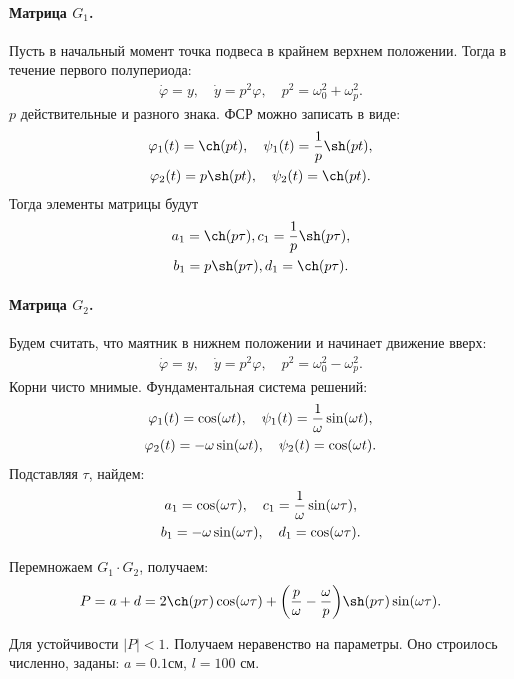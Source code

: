 \paragraph{Матрица $G_1$.} Пусть в начальный момент точка подвеса в крайнем верхнем положении. Тогда в течение первого полупериода:
\begin{gather*}
	\dot{\varphi}=y,\quad
	\dot{y}=p^2\varphi,\quad
	p^2=\omega_0^2 + \omega_p^2.
\end{gather*}
$p$ действительные и разного знака. ФСР можно записать в виде:
\begin{gather}
	\phi_1(t)=\ch(pt),\quad \psi_1(t)=\frac1{p}\sh(pt), \notag \\ 
	\phi_2(t)=p\sh(pt),\quad \psi_2(t)=\ch(pt).		
	\label{eq:90}
\end{gather}
Тогда элементы матрицы будут
\begin{gather*}
	a_1=\ch(p\tau), c_1=\frac1{p}\sh(p\tau), \notag \\ 
	b_1=p\sh(p\tau), d_1=\ch(p\tau).		
\end{gather*}

\paragraph{Матрица $G_2$.} Будем считать, что маятник в нижнем положении и начинает движение вверх:
\begin{gather}
	\dot{\varphi}=y,\quad
	\dot{y}=p^2\varphi,\quad
	p^2=\omega_0^2 - \omega_p^2.
	\label{eq:91}
\end{gather}
Корни чисто мнимые. Фундаментальная система решений:
\begin{gather*}
	\phi_1(t)=\cos(\omega t),\quad \psi_1(t)=\frac1{\omega}\sin(\omega t), \notag \\ 
	\phi_2(t)=-\omega \sin(\omega t),\quad \psi_2(t)=\cos(\omega t).
\end{gather*}
Подставляя $\tau$, найдем:
\begin{gather*}
	a_1=\cos(\omega \tau), \quad c_1=\frac1{\omega}\sin(\omega \tau), \notag \\ 
	b_1=-\omega \sin(\omega \tau), \quad d_1=\cos(\omega \tau).		
\end{gather*}

Перемножаем $G_1 \cdot G_2$, получаем:
\begin{gather*}
	P=a+d=2\ch(p \tau)\cos(\omega \tau)+\qty(\frac{p}{\omega}-\frac{\omega}{p})\sh(p \tau)\sin(\omega \tau).		
\end{gather*}

Для устойчивости $|P|<1$. Получаем неравенство на параметры. Оно строилось численно, заданы: $a=0.1$см, $l=100$ см.

